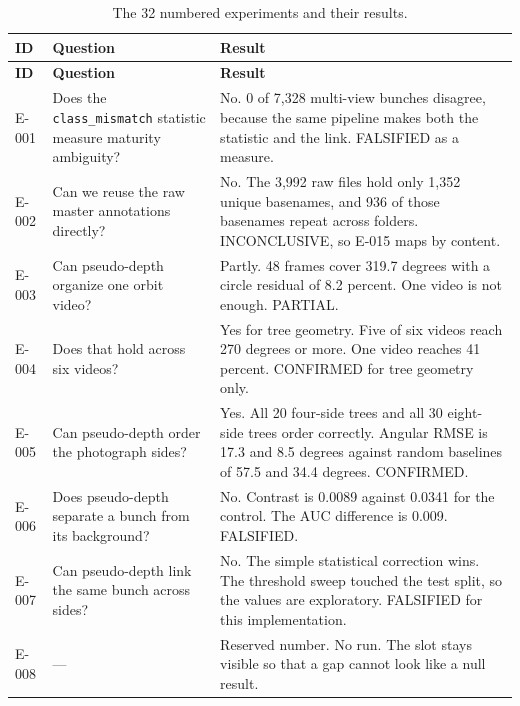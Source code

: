 \documentclass[preprint,12pt]{elsarticle}
\newcommand{\E}[1]{E-#1}
\begin{document}
\begin{longtable}{L{0.07\textwidth}L{0.28\textwidth}L{0.55\textwidth}}
\caption{The 32 numbered experiments and their results.}
\label{tab:allexp}\\
\toprule
\textbf{ID} & \textbf{Question} & \textbf{Result}\\
\midrule
\endfirsthead
\toprule
\textbf{ID} & \textbf{Question} & \textbf{Result}\\
\midrule
\endhead
\bottomrule
\endfoot

\E{001} & Does the \texttt{class\_mismatch} statistic measure maturity
ambiguity? & No. 0 of 7,328 multi-view bunches disagree, because the same
pipeline makes both the statistic and the link. FALSIFIED as a measure.\\

\E{002} & Can we reuse the raw master annotations directly? & No. The 3,992 raw
files hold only 1,352 unique basenames, and 936 of those basenames repeat across
folders. INCONCLUSIVE, so \E{015} maps by content.\\

\E{003} & Can pseudo-depth organize one orbit video? & Partly. 48 frames cover
319.7 degrees with a circle residual of 8.2 percent. One video is not enough.
PARTIAL.\\

\E{004} & Does that hold across six videos? & Yes for tree geometry. Five of six
videos reach 270 degrees or more. One video reaches 41 percent. CONFIRMED for
tree geometry only.\\

\E{005} & Can pseudo-depth order the photograph sides? & Yes. All 20 four-side
trees and all 30 eight-side trees order correctly. Angular RMSE is 17.3 and 8.5
degrees against random baselines of 57.5 and 34.4 degrees. CONFIRMED.\\

\E{006} & Does pseudo-depth separate a bunch from its background? & No. Contrast
is 0.0089 against 0.0341 for the control. The AUC difference is 0.009.
FALSIFIED.\\

\E{007} & Can pseudo-depth link the same bunch across sides? & No. The simple
statistical correction wins. The threshold sweep touched the test split, so the
values are exploratory. FALSIFIED for this implementation.\\

\E{008} & --- & Reserved number. No run. The slot stays visible so that a gap
cannot look like a null result.\\


\end{longtable}
\end{document}
